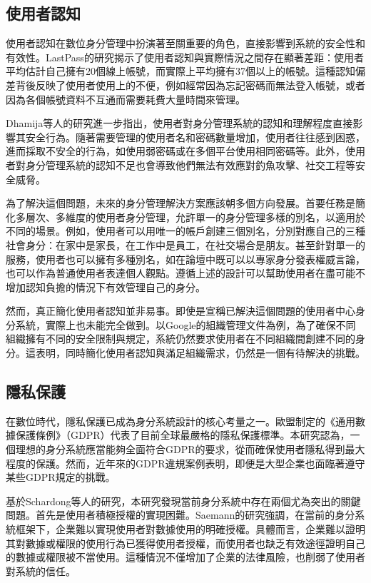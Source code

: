 \subsection{使用者認知}
使用者認知在數位身分管理中扮演著至關重要的角色，直接影響到系統的安全性和有效性。LastPass\cite{lastpass2020psychology}的研究揭示了使用者認知與實際情況之間存在顯著差距：使用者平均估計自己擁有20個線上帳號，而實際上平均擁有37個以上的帳號。這種認知偏差背後反映了使用者使用上的不便，例如經常因為忘記密碼而無法登入帳號，或者因為各個帳號資料不互通而需要耗費大量時間來管理。

Dhamija等人\cite{dhamija2008sevenflaws}的研究進一步指出，使用者對身分管理系統的認知和理解程度直接影響其安全行為。隨著需要管理的使用者名和密碼數量增加，使用者往往感到困惑，進而採取不安全的行為，如使用弱密碼或在多個平台使用相同密碼等。此外，使用者對身分管理系統的認知不足也會導致他們無法有效應對釣魚攻擊、社交工程等安全威脅。

為了解決這個問題，未來的身分管理解決方案應該朝多個方向發展。首要任務是簡化多層次、多維度的使用者身分管理，允許單一的身分管理多樣的別名，以適用於不同的場景。例如，使用者可以用唯一的帳戶創建三個別名，分別對應自己的三種社會身分：在家中是家長，在工作中是員工，在社交場合是朋友。甚至針對單一的服務，使用者也可以擁有多種別名，如在論壇中既可以以專家身分發表權威言論，也可以作為普通使用者表達個人觀點。遵循上述的設計可以幫助使用者在盡可能不增加認知負擔的情況下有效管理自己的身分。

然而，真正簡化使用者認知並非易事。即使是宣稱已解決這個問題的使用者中心身分系統，實際上也未能完全做到。以Google的組織管理文件\cite{gcp2024identity}為例，為了確保不同組織擁有不同的安全限制與規定，系統仍然要求使用者在不同組織間創建不同的身分。這表明，同時簡化使用者認知與滿足組織需求，仍然是一個有待解決的挑戰。
\subsection{隱私保護}
在數位時代，隱私保護已成為身分系統設計的核心考量之一。歐盟制定的《通用數據保護條例》（GDPR）\cite{GDPR2016}代表了目前全球最嚴格的隱私保護標準。本研究認為，一個理想的身分系統應當能夠全面符合GDPR的要求，從而確保使用者隱私得到最大程度的保護。然而，近年來的GDPR違規案例表明，即便是大型企業也面臨著遵守某些GDPR規定的挑戰。

基於Schardong等人的研究\cite{s22155641}，本研究發現當前身分系統中存在兩個尤為突出的關鍵問題。首先是使用者積極授權的實現困難。Saemann\cite{saemann2022investigating}的研究強調，在當前的身分系統框架下，企業難以實現使用者對數據使用的明確授權。具體而言，企業難以證明其對數據或權限的使用行為已獲得使用者授權，而使用者也缺乏有效途徑證明自己的數據或權限被不當使用。這種情況不僅增加了企業的法律風險，也削弱了使用者對系統的信任。

